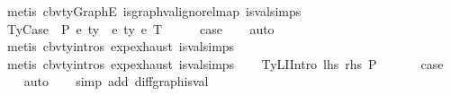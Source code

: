 \begin{isabellebody}
\ {\isacharparenleft}{\kern0pt}metis\ cbv{\isacharunderscore}{\kern0pt}ty{\isacharunderscore}{\kern0pt}GraphE\ is{\isacharunderscore}{\kern0pt}graph{\isacharunderscore}{\kern0pt}val{\isacharunderscore}{\kern0pt}ignore{\isacharunderscore}{\kern0pt}lmap\ is{\isacharunderscore}{\kern0pt}val{\isachardot}{\kern0pt}simps{\isacharparenleft}{\kern0pt}{}{\isacharparenright}{\kern0pt}{\isacharparenright}{\kern0pt}\isanewline
{}\isamarkupfalse%
\isanewline
\ \ \isamarkupfalse%
\ {\isacharparenleft}{\kern0pt}TyCase\ {\isasymGamma}\ P\ e{}\ ty{}\ {\isasymGamma}{}\ e{}\ ty{}\ e{}\ T{\isacharparenright}{\kern0pt}\isanewline
\ \ \isamarkupfalse%
\ \isamarkupfalse%
\ {\isacharquery}{\kern0pt}case\isanewline
\ \ \isamarkupfalse%
\ auto\isanewline
\ \ \isamarkupfalse%
\ {\isacharparenleft}{\kern0pt}metis\ cbv{\isacharunderscore}{\kern0pt}ty{\isachardot}{\kern0pt}intros{\isacharparenleft}{\kern0pt}{}{\isacharparenright}{\kern0pt}\ exp{\isachardot}{\kern0pt}exhaust\ is{\isacharunderscore}{\kern0pt}val{\isachardot}{\kern0pt}simps{\isacharparenleft}{\kern0pt}{}{\isacharcomma}{\kern0pt}{}{\isacharcomma}{\kern0pt}{}{\isacharparenright}{\kern0pt}{\isacharparenright}{\kern0pt}\isanewline
\ \ \isamarkupfalse%
\ {\isacharparenleft}{\kern0pt}metis\ cbv{\isacharunderscore}{\kern0pt}ty{\isachardot}{\kern0pt}intros{\isacharparenleft}{\kern0pt}{}{\isacharparenright}{\kern0pt}\ exp{\isachardot}{\kern0pt}exhaust\ is{\isacharunderscore}{\kern0pt}val{\isachardot}{\kern0pt}simps{\isacharparenleft}{\kern0pt}{}{\isacharcomma}{\kern0pt}{}{\isacharcomma}{\kern0pt}{}{\isacharparenright}{\kern0pt}{\isacharparenright}{\kern0pt}\isanewline
{}\isamarkupfalse%
\isanewline
\ \ \isamarkupfalse%
\ {\isacharparenleft}{\kern0pt}TyLIIntro\ lhs\ rhs\ P\ {\isasymGamma}{\isacharparenright}{\kern0pt}\isanewline
\ \ \isamarkupfalse%
\ \isamarkupfalse%
\ {\isacharquery}{\kern0pt}case\ \isanewline
\ \ \isamarkupfalse%
\ auto\isanewline
\ \ \isamarkupfalse%
\ {\isacharparenleft}{\kern0pt}simp\ add{\isacharcolon}{\kern0pt}\ diffgraph{\isacharunderscore}{\kern0pt}is{\isacharunderscore}{\kern0pt}val{\isacharparenright}{\kern0pt}\isanewline
{}\isamarkupfalse%
\isanewline

\end{isabellebody}
